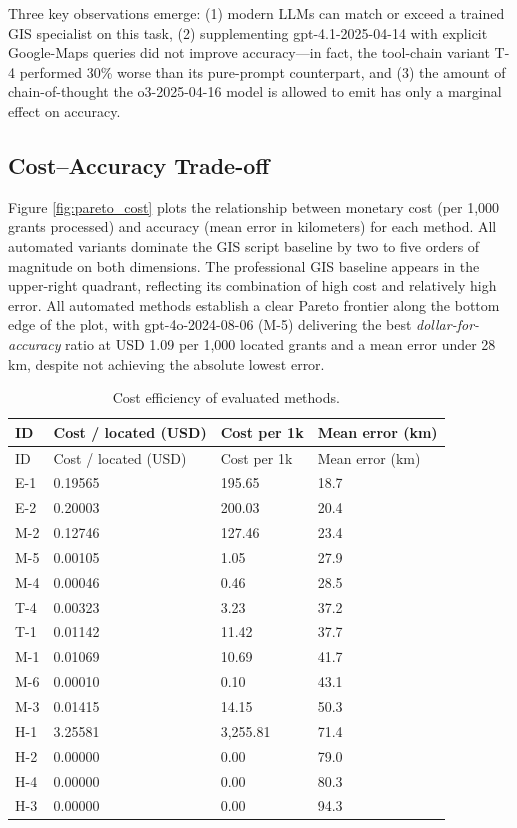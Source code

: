 Three key observations emerge: (1) modern LLMs can match or exceed a
trained GIS specialist on this task, (2) supplementing
gpt-4.1-2025-04-14 with explicit Google-Maps queries did not improve
accuracy---in fact, the tool-chain variant T-4 performed 30\% worse than
its pure-prompt counterpart, and (3) the amount of chain-of-thought the
o3-2025-04-16 model is allowed to emit has only a marginal effect on
accuracy.

\clearpage

\subsection{Cost--Accuracy Trade-off}\label{costaccuracy-trade-off}

Figure \ref{fig:pareto_cost} plots the relationship between monetary
cost (per 1,000 grants processed) and accuracy (mean error in
kilometers) for each method. All automated variants dominate the GIS
script baseline by two to five orders of magnitude on both dimensions.
The professional GIS baseline appears in the upper-right quadrant,
reflecting its combination of high cost and relatively high error. All
automated methods establish a clear Pareto frontier along the bottom
edge of the plot, with gpt-4o-2024-08-06 (M-5) delivering the best
\emph{dollar-for-accuracy} ratio at USD 1.09 per 1,000 located grants
and a mean error under 28 km, despite not achieving the absolute lowest
error.

\begin{longtable}[]{@{}llll@{}}
\caption{\label{tbl:cost}Cost efficiency of evaluated
methods.}\tabularnewline
\toprule\noalign{}
ID & Cost / located (USD) & Cost per 1k & Mean error (km) \\
\midrule\noalign{}
\endfirsthead
\toprule\noalign{}
ID & Cost / located (USD) & Cost per 1k & Mean error (km) \\
\midrule\noalign{}
\endhead
\bottomrule\noalign{}
\endlastfoot
E-1 & 0.19565 & 195.65 & 18.7 \\
E-2 & 0.20003 & 200.03 & 20.4 \\
M-2 & 0.12746 & 127.46 & 23.4 \\
M-5 & 0.00105 & 1.05 & 27.9 \\
M-4 & 0.00046 & 0.46 & 28.5 \\
T-4 & 0.00323 & 3.23 & 37.2 \\
T-1 & 0.01142 & 11.42 & 37.7 \\
M-1 & 0.01069 & 10.69 & 41.7 \\
M-6 & 0.00010 & 0.10 & 43.1 \\
M-3 & 0.01415 & 14.15 & 50.3 \\
H-1 & 3.25581 & 3,255.81 & 71.4 \\
H-2 & 0.00000 & 0.00 & 79.0 \\
H-4 & 0.00000 & 0.00 & 80.3 \\
H-3 & 0.00000 & 0.00 & 94.3 \\
\end{longtable}

